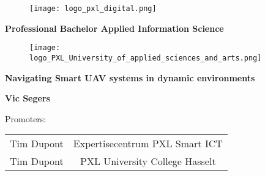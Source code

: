 \begin{titlepage}
  \color{pxlgreen}
  \begin{figure}
    \centering
    \texttt{[image: logo\_pxl\_digital.png]}
  \end{figure}
  \vspace{\baselineskip}
  \begin{center}
    \LARGE\textbf{\textcolor{pxlgreen}{Professional Bachelor Applied Information Science}}
  \end{center}
  \vspace{\baselineskip}
  \begin{figure}[h]
    \centering
    \texttt{[image: logo\_PXL\_University\_of\_applied\_sciences\_and\_arts.png]}
  \end{figure}
  \begin{center}
    \Huge\textbf{\textcolor{pxlgreen}{Navigating Smart UAV systems in dynamic environments}}
  \end{center}
  \vspace{\baselineskip}
  \begin{center}
    \Large\textbf{\textcolor{pxlgreen}{Vic Segers}}
  \end{center}
  \vspace{\baselineskip}
  \begin{center}
    \large\textcolor{pxlgreen}{Promoters:}
  \end{center}
  \begin{tabularx}{\textwidth}{C C}
    Tim Dupont & Expertisecentrum PXL Smart ICT\\
    Tim Dupont & PXL University College Hasselt
  \end{tabularx}
\end{titlepage}